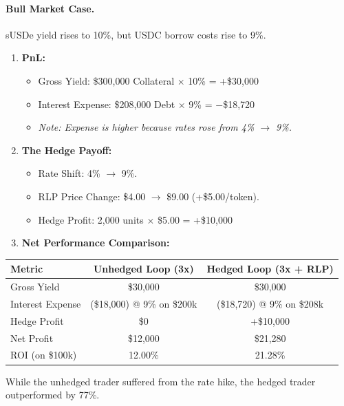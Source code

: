 \documentclass[12pt]{article}
\begin{document}
\paragraph{Bull Market Case.}
sUSDe yield rises to 10\%, but USDC borrow costs rise to 9\%.

\begin{enumerate}
    \item \textbf{PnL:}
    \begin{itemize}
        \item Gross Yield: \$300,000 Collateral $\times$ 10\% = +\$30,000
        \item Interest Expense: \$208,000 Debt $\times$ 9\% = $-$\$18,720
        \item \emph{Note: Expense is higher because rates rose from 4\% $\rightarrow$ 9\%.}
    \end{itemize}
    \item \textbf{The Hedge Payoff:}
    \begin{itemize}
        \item Rate Shift: 4\% $\rightarrow$ 9\%.
        \item RLP Price Change: \$4.00 $\rightarrow$ \$9.00 (+\$5.00/token).
        \item Hedge Profit: 2,000 units $\times$ \$5.00 = +\$10,000
    \end{itemize}
    \item \textbf{Net Performance Comparison:}
\end{enumerate}

\begin{table}[H]
\centering
\small
\begin{tabular}{@{}lcc@{}}
\toprule
\textbf{Metric} & \textbf{Unhedged Loop (3x)} & \textbf{Hedged Loop (3x + RLP)} \\
\midrule
Gross Yield       & \$30,000   & \$30,000   \\
Interest Expense  & (\$18,000) @ 9\% on \$200k & (\$18,720) @ 9\% on \$208k \\
Hedge Profit      & \$0        & +\$10,000  \\
Net Profit        & \$12,000   & \$21,280   \\
ROI (on \$100k)   & 12.00\%    & 21.28\%    \\
\bottomrule
\end{tabular}
\end{table}

While the unhedged trader suffered from the rate hike, the hedged trader outperformed by 77\%.
\end{document}

